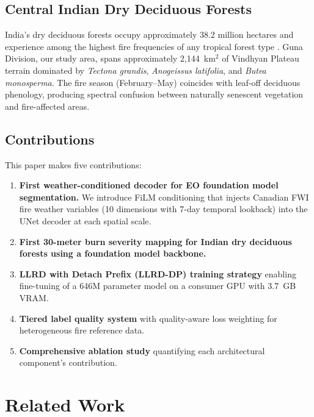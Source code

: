 \documentclass[review,12pt]{elsarticle}
\begin{document}
\subsection{Central Indian Dry Deciduous Forests}

India's dry deciduous forests occupy approximately 38.2 million hectares and experience among the highest fire frequencies of any tropical forest type \citep{fsi2023}. Guna Division, our study area, spans approximately 2,144~km$^2$ of Vindhyan Plateau terrain dominated by \textit{Tectona grandis}, \textit{Anogeissus latifolia}, and \textit{Butea monosperma}. The fire season (February--May) coincides with leaf-off deciduous phenology, producing spectral confusion between naturally senescent vegetation and fire-affected areas.

\subsection{Contributions}

This paper makes five contributions:

\begin{enumerate}
  \item \textbf{First weather-conditioned decoder for EO foundation model segmentation.} We introduce FiLM conditioning that injects Canadian FWI fire weather variables (10 dimensions with 7-day temporal lookback) into the UNet decoder at each spatial scale.
  \item \textbf{First 30-meter burn severity mapping for Indian dry deciduous forests using a foundation model backbone.}
  \item \textbf{LLRD with Detach Prefix (LLRD-DP) training strategy} enabling fine-tuning of a 646M parameter model on a consumer GPU with 3.7~GB VRAM.
  \item \textbf{Tiered label quality system} with quality-aware loss weighting for heterogeneous fire reference data.
  \item \textbf{Comprehensive ablation study} quantifying each architectural component's contribution.
\end{enumerate}


\section{Related Work}
\label{sec:related}
\end{document}
